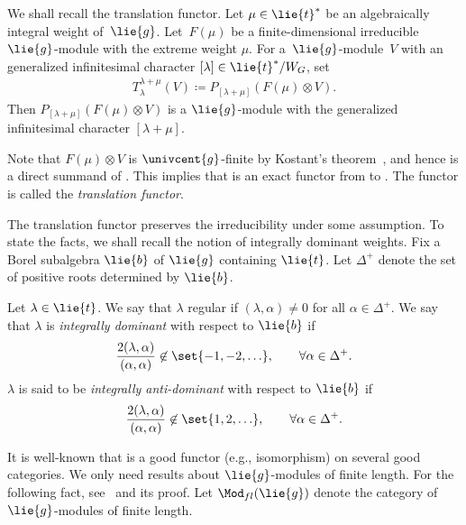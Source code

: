 We shall recall the translation functor.
Let $\mu \in \lie{t}^*$ be an algebraically integral weight of~$\lie{g}$.
Let~$F(\mu)$ be a finite-dimensional irreducible $\lie{g}$-module with the extreme weight $\mu$.
For a~$\lie{g}$-module~$V$ with an generalized infinitesimal character $[\lambda] \in \lie{t}^*/W_G$, set
\begin{align*}
	T_\lambda^{\lambda + \mu}(V) \coloneq P_{[\lambda + \mu]}(F(\mu)\otimes V).
\end{align*}
Then $P_{[\lambda + \mu]}(F(\mu)\otimes V)$ is a $\lie{g}$-module with the generalized infinitesimal character $[\lambda + \mu]$.

Note that $F(\mu)\otimes V$ is $\univcent{g}$-finite by Kostant's theorem~\cite[Theorem~7.133]{KnVo95_cohomological_induction},
and hence  is a direct summand of .
This implies that  is an exact functor from  to .
The functor is called the \emph{translation functor}.

The translation functor preserves the irreducibility under some assumption.
To state the facts, we shall recall the notion of integrally dominant weights.
Fix a Borel subalgebra $\lie{b}$ of $\lie{g}$ containing $\lie{t}$.
Let $\Delta^+$ denote the set of positive roots determined by $\lie{b}$.

\begin{Definition}\label{def:IntegrallyDominant}
	Let $\lambda\in \lie{t}$.
	We say that $\lambda$ regular if $(\lambda, \alpha) \neq 0$ for all $\alpha \in \Delta^+$.
	We say that $\lambda$ is \emph{integrally dominant} with respect to $\lie{b}$ if
	\begin{align*}
		\frac{2(\lambda, \alpha)}{(\alpha, \alpha)} \not \in \set{-1, -2, \ldots}, \qquad \forall \alpha \in \Delta^+.
	\end{align*}
	$\lambda$ is said to be \emph{integrally anti-dominant} with respect to $\lie{b}$ if
	\begin{align*}
		\frac{2(\lambda, \alpha)}{(\alpha, \alpha)} \not \in \set{1, 2, \ldots}, \qquad \forall \alpha \in \Delta^+.
	\end{align*}
\end{Definition}

It is well-known that  is a good functor (e.g., isomorphism) on several good categories.
We only need results about $\lie{g}$-modules of finite length.
For the following fact, see~\cite[Corollary~7.209]{KnVo95_cohomological_induction} and its proof.
Let $\Mod_{fl}(\lie{g})$ denote the category of $\lie{g}$-modules of finite length.

